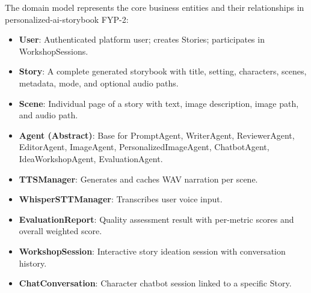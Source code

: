 The domain model represents the core business entities and their relationships in personalized-ai-storybook FYP-2:

\begin{itemize}
    \item \textbf{User}: Authenticated platform user; creates Stories; participates in WorkshopSessions.
    \item \textbf{Story}: A complete generated storybook with title, setting, characters, scenes, metadata, mode, and optional audio paths.
    \item \textbf{Scene}: Individual page of a story with text, image description, image path, and audio path.
    \item \textbf{Agent (Abstract)}: Base for PromptAgent, WriterAgent, ReviewerAgent, EditorAgent, ImageAgent, PersonalizedImageAgent, ChatbotAgent, IdeaWorkshopAgent, EvaluationAgent.
    \item \textbf{TTSManager}: Generates and caches WAV narration per scene.
    \item \textbf{WhisperSTTManager}: Transcribes user voice input.
    \item \textbf{EvaluationReport}: Quality assessment result with per-metric scores and overall weighted score.
    \item \textbf{WorkshopSession}: Interactive story ideation session with conversation history.
    \item \textbf{ChatConversation}: Character chatbot session linked to a specific Story.
\end{itemize}
